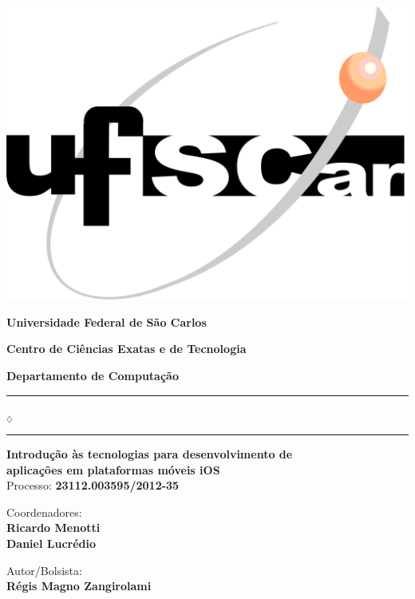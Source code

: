 
\begin{center}

\begin{minipage}[c]{\textwidth}
  \parbox[c]{3cm}{
      \begin{flushright}
      \includegraphics[width=.25\textwidth]{../figuras/LogoUfscar}
      \end{flushright}
  }
  \parbox[c]{12cm}
    {
      \begin{center}
      \textbf{\Large Universidade Federal de São Carlos}

      \vspace{0.07cm}

      \textbf{\large Centro de Ciências Exatas e de Tecnologia}

      \vspace{0.07cm}

      \textbf{\large Departamento de Computação}
      \vspace{0.07cm}
      \end{center}
    }
\end{minipage}

\vspace{-0.5cm}
\rule{7.5cm}{0.03pc}{\tiny $_\diamondsuit$}\rule{7.5cm}{0.03pc}

\vspace*{20ex}

\textbf{\Large {Introdução às tecnologias para desenvolvimento de \\ aplicações em plataformas móveis iOS}} \\
\large{ Processo: \textbf{23112.003595/2012-35}}

\vspace*{5ex}

{\Large{ Coordenadores:  }} \\
\textbf{\Large{ Ricardo Menotti}} \\
\textbf{\Large{ Daniel Lucrédio}}

\vspace*{5ex}

{\Large{ Autor/Bolsista:  }}  \\
\textbf{\Large{ Régis Magno Zangirolami } } 


\end{center}
